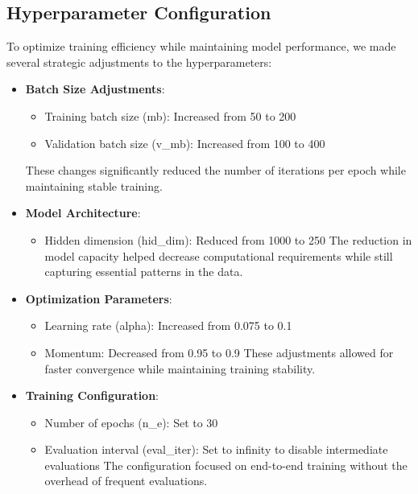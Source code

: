 \documentclass{article}
\begin{document}
\subsection{Hyperparameter Configuration}
To optimize training efficiency while maintaining model performance, we made several strategic adjustments to the hyperparameters:

\begin{itemize}
    \item \textbf{Batch Size Adjustments}:
    \begin{itemize}
        \item Training batch size (mb): Increased from 50 to 200
        \item Validation batch size (v\_mb): Increased from 100 to 400
    \end{itemize}
    These changes significantly reduced the number of iterations per epoch while maintaining stable training.

    \item \textbf{Model Architecture}:
    \begin{itemize}
        \item Hidden dimension (hid\_dim): Reduced from 1000 to 250
        The reduction in model capacity helped decrease computational requirements while still capturing essential patterns in the data.
    \end{itemize}

    \item \textbf{Optimization Parameters}:
    \begin{itemize}
        \item Learning rate (alpha): Increased from 0.075 to 0.1
        \item Momentum: Decreased from 0.95 to 0.9
        These adjustments allowed for faster convergence while maintaining training stability.
    \end{itemize}

    \item \textbf{Training Configuration}:
    \begin{itemize}
        \item Number of epochs (n\_e): Set to 30
        \item Evaluation interval (eval\_iter): Set to infinity to disable intermediate evaluations
        The configuration focused on end-to-end training without the overhead of frequent evaluations.
    \end{itemize}
\end{itemize}
\end{document}
